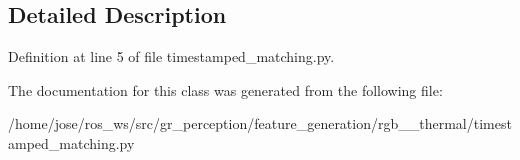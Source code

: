 \subsection{Detailed Description}


Definition at line 5 of file timestamped\+\_\+matching.\+py.



The documentation for this class was generated from the following file\+:\begin{DoxyCompactItemize}
\item 
/home/jose/ros\+\_\+ws/src/gr\+\_\+perception/feature\+\_\+generation/rgb\+\_\+\_\+thermal/timestamped\+\_\+matching.\+py\end{DoxyCompactItemize}
